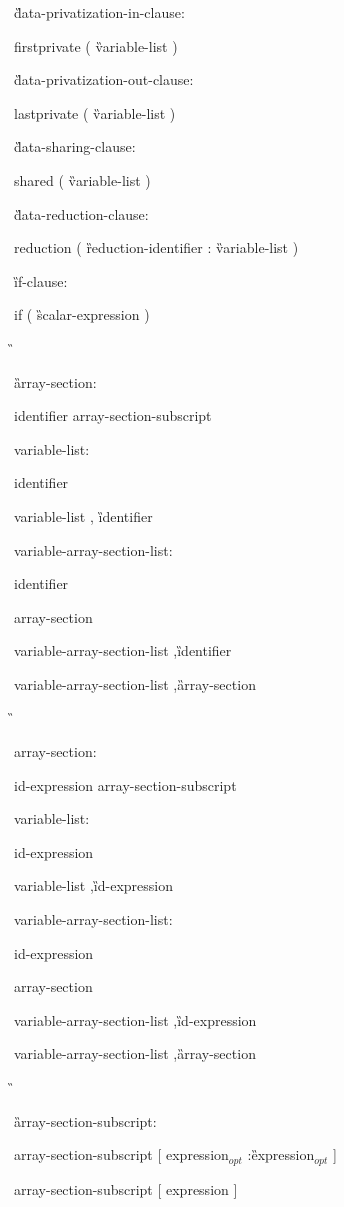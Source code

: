 {\G data-privatization-in-clause:

\C\I firstprivate ( \G variable-list \C )

\G data-privatization-out-clause:

\C\I lastprivate ( \G variable-list \C )

\G data-sharing-clause:

\C\I shared ( \G variable-list \C )

\G data-reduction-clause:

\C\I reduction ( \G reduction-identifier \C : \G variable-list \C )

\G if-clause:

\C\I if ( \G scalar-expression \C )

\G\cspecificstart

\G array-section:

\I identifier array-section-subscript

variable-list:

\I identifier

\I variable-list \C, \G identifier

variable-array-section-list:

\I identifier

\I array-section

\I variable-array-section-list \C ,\G identifier

\I variable-array-section-list \C ,\G array-section

\G\cspecificend

\cppspecificstart

\I array-section:

\I id-expression array-section-subscript

variable-list:

\I id-expression

\I variable-list \C ,\G id-expression

variable-array-section-list:

\I id-expression

\I array-section

\I variable-array-section-list \C ,\G id-expression

\I variable-array-section-list \C ,\G array-section

\G\cppspecificend

\G array-section-subscript:

\I array-section-subscript [ expression$_{opt}$ \C :\G expression$_{opt}$ ]

\I array-section-subscript [ expression ]


\I [ expression ]

} %


